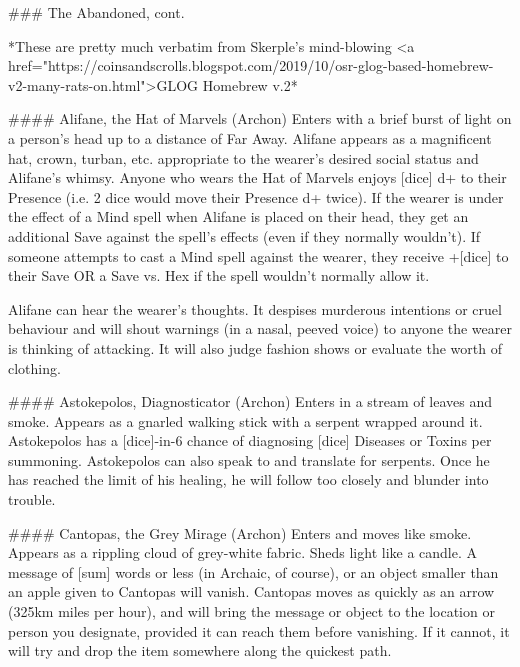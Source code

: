 ### The Abandoned, cont.

*These are pretty much verbatim from Skerple's mind-blowing <a href="https://coinsandscrolls.blogspot.com/2019/10/osr-glog-based-homebrew-v2-many-rats-on.html">GLOG Homebrew v.2*



####  Alifane, the Hat of Marvels (Archon)
Enters with a brief burst of light on a person's head up to a distance of Far Away.  Alifane appears as a magnificent hat, crown, turban, etc. appropriate to the wearer's desired social status and Alifane's whimsy.  Anyone who wears the Hat of Marvels enjoys [dice] {d+} to their Presence (i.e. 2 dice would move their Presence {d+} twice).  If the wearer is under the effect of a Mind spell when Alifane is placed on their head, they get an additional Save against the spell's effects (even if they normally wouldn't).  If someone attempts to cast a Mind spell against the wearer, they receive +[dice] to their Save OR a Save vs. Hex if the spell wouldn't normally allow it.

Alifane can hear the wearer's thoughts. It despises murderous intentions or cruel behaviour and will shout warnings (in a nasal, peeved voice) to anyone the wearer is thinking of attacking. It will also judge fashion shows or evaluate the worth of clothing.


####  Astokepolos, Diagnosticator (Archon)
Enters in a stream of leaves and smoke. Appears as a gnarled walking stick with a serpent wrapped around it. Astokepolos has a [dice]-in-6 chance of diagnosing [dice] Diseases or Toxins per summoning.  Astokepolos can also speak to and translate for serpents. Once he has reached the limit of his healing, he will follow too closely and blunder into trouble.


####  Cantopas, the Grey Mirage (Archon)
Enters and moves like smoke. Appears as a rippling cloud of grey-white fabric. Sheds light like a candle. A message of [sum] words or less (in Archaic, of course), or an object smaller than an apple given to Cantopas will vanish. Cantopas moves as quickly as an arrow (325km miles per hour), and will bring the message or object to the location or person you designate, provided it can reach them before vanishing. If it cannot, it will try and drop the item somewhere along the quickest path. 



